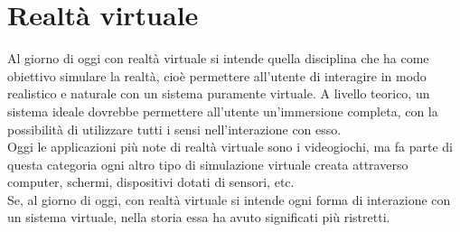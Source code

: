 
\chapter{Realtà virtuale}

Al giorno di oggi con realtà virtuale si intende quella disciplina che ha come obiettivo simulare la realtà, cioè permettere all'utente di interagire in modo realistico e naturale con un sistema puramente virtuale.
A livello teorico, un sistema ideale dovrebbe permettere all'utente un'immersione completa, con la possibilità di utilizzare tutti i sensi nell'interazione con esso.\\
Oggi le applicazioni più note di realtà virtuale sono i videogiochi, ma fa parte di questa categoria ogni altro tipo di simulazione virtuale creata attraverso computer, schermi, dispositivi dotati di sensori, etc.\\
Se, al giorno di oggi, con realtà virtuale si intende ogni forma di interazione con un sistema virtuale, nella storia essa ha avuto significati più ristretti.
 
